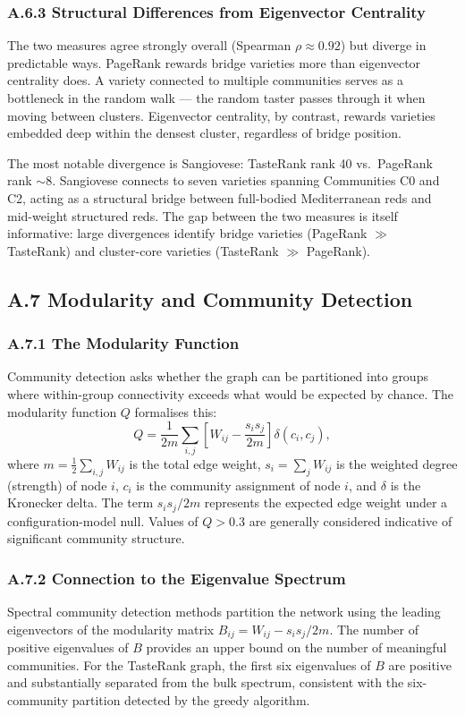 \documentclass[11pt]{article}
\begin{document}
\subsubsection*{A.6.3 Structural Differences from Eigenvector Centrality}
The two measures agree strongly overall (Spearman $\rho \approx 0.92$) but diverge in predictable ways. PageRank rewards bridge varieties more than eigenvector centrality does. A variety connected to multiple communities serves as a bottleneck in the random walk --- the random taster passes through it when moving between clusters. Eigenvector centrality, by contrast, rewards varieties embedded deep within the densest cluster, regardless of bridge position.

The most notable divergence is Sangiovese: TasteRank rank 40 vs.\ PageRank rank $\sim 8$. Sangiovese connects to seven varieties spanning Communities C0 and C2, acting as a structural bridge between full-bodied Mediterranean reds and mid-weight structured reds. The gap between the two measures is itself informative: large divergences identify bridge varieties (PageRank $\gg$ TasteRank) and cluster-core varieties (TasteRank $\gg$ PageRank).

\subsection*{A.7 Modularity and Community Detection}

\subsubsection*{A.7.1 The Modularity Function}
Community detection asks whether the graph can be partitioned into groups where within-group connectivity exceeds what would be expected by chance. The modularity function $Q$ formalises this:
\[
Q = \frac{1}{2m} \sum_{i,j} \left[ W_{ij} - \frac{s_i s_j}{2m} \right] \delta(c_i, c_j),
\]
where $m = \tfrac{1}{2} \sum_{i,j} W_{ij}$ is the total edge weight, $s_i = \sum_j W_{ij}$ is the weighted degree (strength) of node $i$, $c_i$ is the community assignment of node $i$, and $\delta$ is the Kronecker delta. The term $s_i s_j / 2m$ represents the expected edge weight under a configuration-model null. Values of $Q > 0.3$ are generally considered indicative of significant community structure.

\subsubsection*{A.7.2 Connection to the Eigenvalue Spectrum}
Spectral community detection methods partition the network using the leading eigenvectors of the modularity matrix $B_{ij} = W_{ij} - s_i s_j / 2m$. The number of positive eigenvalues of $B$ provides an upper bound on the number of meaningful communities. For the TasteRank graph, the first six eigenvalues of $B$ are positive and substantially separated from the bulk spectrum, consistent with the six-community partition detected by the greedy algorithm.
\end{document}
